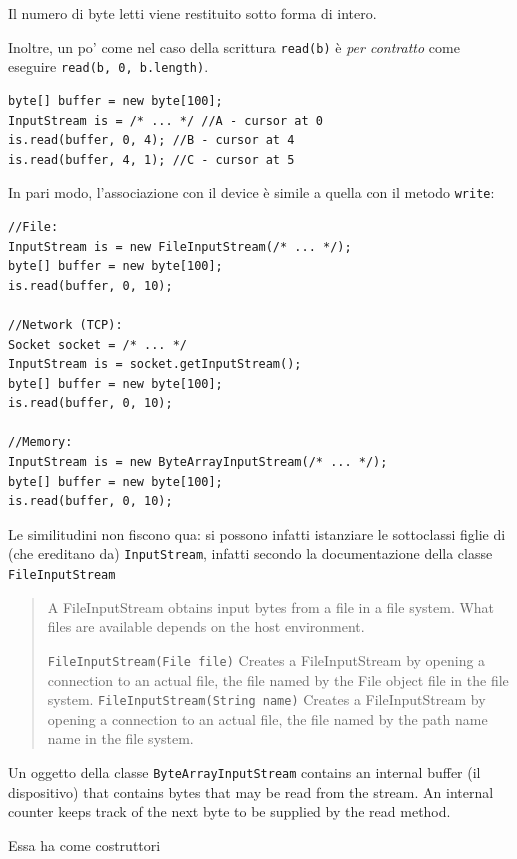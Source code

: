 \documentclass[\fontsizeclass,twocolumn]{\classname}
\theoremstyle{definition}
\theoremstyle{definition}
\begin{document}
Il numero di byte letti viene restituito sotto forma di intero.

Inoltre, un po' come nel caso della scrittura \texttt{read(b)} è \emph{per
contratto} come eseguire \texttt{read(b, 0, b.length)}.

\begin{lstlisting}
byte[] buffer = new byte[100];
InputStream is = /* ... */ //A - cursor at 0
is.read(buffer, 0, 4); //B - cursor at 4
is.read(buffer, 4, 1); //C - cursor at 5
\end{lstlisting}

In pari modo, l'associazione con il device è simile a quella con il metodo
\texttt{write}:

\begin{lstlisting}
//File:
InputStream is = new FileInputStream(/* ... */);
byte[] buffer = new byte[100];
is.read(buffer, 0, 10);

//Network (TCP):
Socket socket = /* ... */
InputStream is = socket.getInputStream();
byte[] buffer = new byte[100];
is.read(buffer, 0, 10);

//Memory:
InputStream is = new ByteArrayInputStream(/* ... */);
byte[] buffer = new byte[100];
is.read(buffer, 0, 10);
\end{lstlisting}

Le similitudini non fiscono qua: si possono infatti istanziare le sottoclassi
figlie di (che ereditano da) \texttt{Input\-Stream}, infatti secondo la
documentazione della classe \texttt{FileInputStream}

\begin{quote}
    \footnotesize{
A FileInputStream obtains input bytes from a file in a file system. What files are available depends on the host environment.

\texttt{FileInputStream(File file)} 	Creates a FileInputStream by opening a connection to an actual file, the file named by the File object file in the file system.
\texttt{FileInputStream(String name)} 	Creates a FileInputStream by opening a connection to an actual file, the file named by the path name name in the file system.
    }
\end{quote}

Un oggetto della classe \texttt{ByteArrayInputStream} {\footnotesize contains an
internal buffer} (il dispositivo) {\footnotesize that contains bytes that may be
read from the stream. An internal counter keeps track of the next byte to be
supplied by the read method.}

Essa ha come costruttori 
\end{document}
